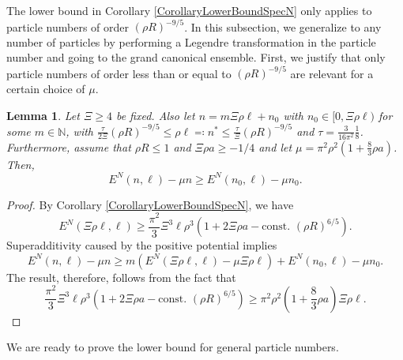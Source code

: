 \documentclass[a4paper,11pt]{article}
\newtheorem{lemma}[theorem]{Lemma}
\numberwithin{equation}{section}
\begin{document}
	The lower bound in Corollary \ref{CorollaryLowerBoundSpecN} only applies to particle numbers of order $ (\rho R)^{-9/5} $. In this subsection, we generalize to any number of particles by performing a Legendre transformation in the particle number and going to the grand canonical ensemble. First, we justify that only particle numbers of order less than or equal to $ (\rho R)^{-9/5} $ are relevant for a certain choice of $ \mu $.
		\begin{lemma}\label{LemmaLocalizationFbound}
			Let $ \Xi\geq 4 $ be fixed. Also let $ n=m\Xi \rho \ell+n_0 $ with $ n_0\in[0,\Xi\rho \ell) $ for some $ m\in\mathbb{N} $, with $\frac{\tau}{2\Xi} (\rho R)^{-9/5} \leq \rho\ell\eqqcolon n^{\ast}\leq \frac{\tau}{\Xi} (\rho R)^{-9/5} $ and $ \tau=\frac{3}{16\pi^2}\frac{1}{8} $. Furthermore, assume that $ \rho R\leq  1 $ and $\Xi \rho a \geq-1/4$ and let $ \mu=\pi^2\rho^2\left(1+\frac{8}{3}\rho a\right) $. Then,  \begin{equation}
			E^{N}(n,\ell)-\mu n \geq E^{N}(n_0,\ell)-\mu n_0.
			\end{equation}
		\end{lemma}
		\begin{proof}
			By Corollary \ref{CorollaryLowerBoundSpecN}, we have \begin{equation}
			E^{N}(\Xi\rho\ell,\ell)\geq\frac{\pi^2}{3}\Xi^3\ell\rho^3\left(1+2\Xi\rho a-\text{const. }(\rho R)^{6/5}\right).
			\end{equation}
			Superadditivity caused by the positive potential implies \begin{equation}
			E^N(n,\ell)-\mu n\geq m\left(E^N(\Xi\rho\ell,\ell)-\mu\Xi\rho\ell \right)+E^N(n_0,\ell)-\mu n_0.
			\end{equation}
			The result, therefore, follows from the fact that \begin{equation}
			\frac{\pi^2}{3}\Xi^3\ell\rho^3\left(1+2\Xi\rho a-\text{const. }(\rho R)^{6/5}\right)\geq \pi^2\rho^2\left(1+\frac{8}{3}\rho a\right) \Xi\rho\ell.
			\end{equation}
		\end{proof}
	We are ready to prove the lower bound for general particle numbers.
\end{document}
